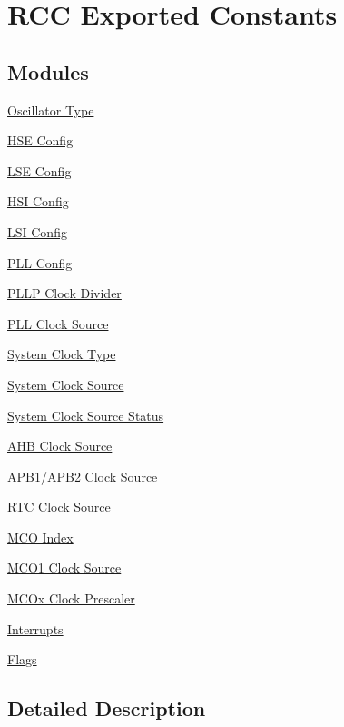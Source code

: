 \hypertarget{group___r_c_c___exported___constants}{}\section{R\+CC Exported Constants}
\label{group___r_c_c___exported___constants}
\subsection*{Modules}
\begin{DoxyCompactItemize}
\item 
\hyperlink{group___r_c_c___oscillator___type}{Oscillator Type}
\item 
\hyperlink{group___r_c_c___h_s_e___config}{H\+S\+E Config}
\item 
\hyperlink{group___r_c_c___l_s_e___config}{L\+S\+E Config}
\item 
\hyperlink{group___r_c_c___h_s_i___config}{H\+S\+I Config}
\item 
\hyperlink{group___r_c_c___l_s_i___config}{L\+S\+I Config}
\item 
\hyperlink{group___r_c_c___p_l_l___config}{P\+L\+L Config}
\item 
\hyperlink{group___r_c_c___p_l_l_p___clock___divider}{P\+L\+L\+P Clock Divider}
\item 
\hyperlink{group___r_c_c___p_l_l___clock___source}{P\+L\+L Clock Source}
\item 
\hyperlink{group___r_c_c___system___clock___type}{System Clock Type}
\item 
\hyperlink{group___r_c_c___system___clock___source}{System Clock Source}
\item 
\hyperlink{group___r_c_c___system___clock___source___status}{System Clock Source Status}
\item 
\hyperlink{group___r_c_c___a_h_b___clock___source}{A\+H\+B Clock Source}
\item 
\hyperlink{group___r_c_c___a_p_b1___a_p_b2___clock___source}{A\+P\+B1/\+A\+P\+B2 Clock Source}
\item 
\hyperlink{group___r_c_c___r_t_c___clock___source}{R\+T\+C Clock Source}
\item 
\hyperlink{group___r_c_c___m_c_o___index}{M\+C\+O Index}
\item 
\hyperlink{group___r_c_c___m_c_o1___clock___source}{M\+C\+O1 Clock Source}
\item 
\hyperlink{group___r_c_c___m_c_ox___clock___prescaler}{M\+C\+Ox Clock Prescaler}
\item 
\hyperlink{group___r_c_c___interrupt}{Interrupts}
\item 
\hyperlink{group___r_c_c___flag}{Flags}
\end{DoxyCompactItemize}


\subsection{Detailed Description}
